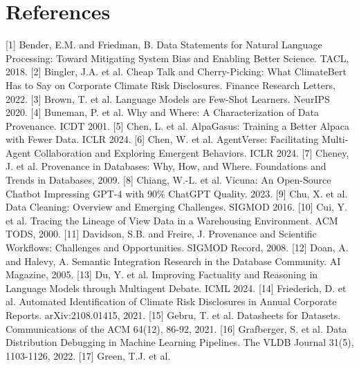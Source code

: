 \documentclass[9pt,twocolumn]{extarticle}
\begin{document}
\section{References}
\protect{}\label{ref_1}{}[1] Bender, E.M. and Friedman,
B. Data Statements for Natural Language Processing: Toward Mitigating
System Bias and Enabling Better Science. TACL, 2018.
\protect{}\label{ref_2}{}[2] Bingler, J.A. et al. Cheap
Talk and Cherry-Picking: What ClimateBert Has to Say on Corporate
Climate Risk Disclosures. Finance Research Letters, 2022.
\protect{}\label{ref_3}{}[3] Brown, T. et al. Language
Models are Few-Shot Learners. NeurIPS 2020.
\protect{}\label{ref_4}{}[4] Buneman, P. et al. Why and
Where: A Characterization of Data Provenance. ICDT 2001.
\protect{}\label{ref_5}{}[5] Chen, L. et al. AlpaGasus:
Training a Better Alpaca with Fewer Data. ICLR 2024.
\protect{}\label{ref_6}{}[6] Chen, W. et al.
AgentVerse: Facilitating Multi-Agent Collaboration and Exploring
Emergent Behaviors. ICLR 2024.
\protect{}\label{ref_7}{}[7] Cheney, J. et al.
Provenance in Databases: Why, How, and Where. Foundations and Trends in
Databases, 2009.
\protect{}\label{ref_8}{}[8] Chiang, W.-L. et al.
Vicuna: An Open-Source Chatbot Impressing GPT-4 with 90\% ChatGPT
Quality. 2023.
\protect{}\label{ref_9}{}[9] Chu, X. et al. Data
Cleaning: Overview and Emerging Challenges. SIGMOD 2016.
\protect{}\label{ref_10}{}[10] Cui, Y. et al. Tracing
the Lineage of View Data in a Warehousing Environment. ACM TODS, 2000.
\protect{}\label{ref_11}{}[11] Davidson, S.B. and
Freire, J. Provenance and Scientific Workflows: Challenges and
Opportunities. SIGMOD Record, 2008.
\protect{}\label{ref_12}{}[12] Doan, A. and Halevy, A.
Semantic Integration Research in the Database Community. AI Magazine,
2005.
\protect{}\label{ref_13}{}[13] Du, Y. et al. Improving
Factuality and Reasoning in Language Models through Multiagent Debate.
ICML 2024.
\protect{}\label{ref_14}{}[14] Friederich, D. et al.
Automated Identification of Climate Risk Disclosures in Annual Corporate
Reports. arXiv:2108.01415, 2021.
\protect{}\label{ref_15}{}[15] Gebru, T. et al.
Datasheets for Datasets. Communications of the ACM 64(12), 86-92, 2021.
\protect{}\label{ref_16}{}[16] Grafberger, S. et al.
Data Distribution Debugging in Machine Learning Pipelines. The VLDB
Journal 31(5), 1103-1126, 2022.
\protect{}\label{ref_17}{}[17] Green, T.J. et al.
\end{document}
